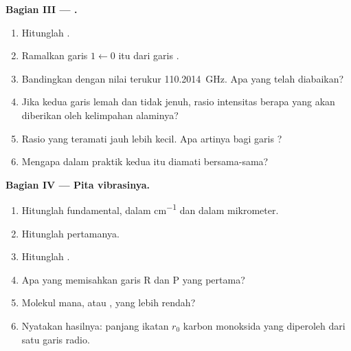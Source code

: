 \begin{problem}
\medskip\noindent\textbf{Bagian III --- .}
\begin{enumerate}[resume, beginpenalty=10000]
  \item Hitunglah  .
  \item Ramalkan garis $1 \leftarrow 0$  itu dari garis .
  \item Bandingkan dengan nilai terukur \qty{110.2014}{GHz}. Apa yang telah
        diabaikan?
  \item Jika kedua garis lemah dan tidak jenuh, rasio intensitas berapa yang
        akan diberikan oleh kelimpahan alaminya?
  \item Rasio yang teramati jauh lebih kecil. Apa artinya bagi garis
        ?
  \item Mengapa dalam praktik kedua  itu diamati bersama-sama?
\end{enumerate}

\medskip\noindent\textbf{Bagian IV --- Pita vibrasinya.}
\begin{enumerate}[resume, beginpenalty=10000]
  \item Hitunglah  fundamental, dalam \unit{cm^{-1}} dan dalam
        mikrometer.
  \item Hitunglah  pertamanya.
  \item Hitunglah .
  \item Apa yang memisahkan garis R dan P yang pertama?
  \item Molekul mana,  atau , yang 
        lebih rendah?
  \item Nyatakan hasilnya: panjang ikatan $r_0$ karbon monoksida yang
        diperoleh dari satu garis radio.
\end{enumerate}
\end{problem}
